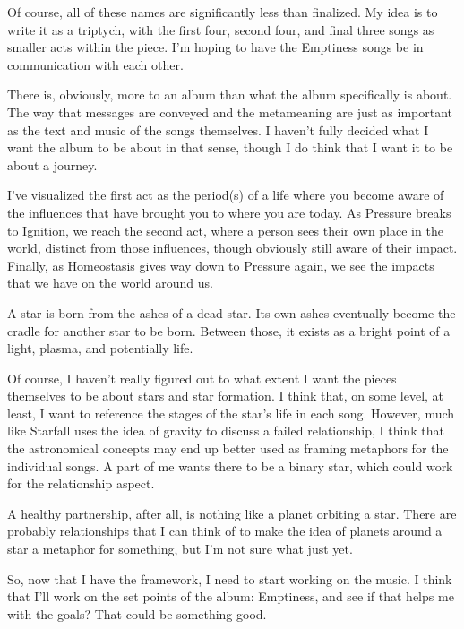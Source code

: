 \documentclass[12pt]{article}[titlepage]
\renewcommand{\,}{\textsuperscript{,}}
\begin{document}
Of course, all of these names are significantly less than finalized.
My idea is to write it as a triptych, with the first four, second four, and final three songs as smaller acts within the piece.
I'm hoping to have the Emptiness songs be in communication with each other.

There is, obviously, more to an album than what the album specifically is about.
The way that messages are conveyed and the metameaning\endnotemark[7] are just as important as the text and music of the songs themselves.
I haven't fully decided what I want the album to be about in that sense, though I do think that I want it to be about a journey.

I've visualized the first act as the period(s) of a life where you become aware of the influences that have brought you to where you are today.
As Pressure breaks to Ignition, we reach the second act, where a person sees their own place in the world, distinct from those influences, though obviously still aware of their impact.
Finally, as Homeostasis gives way down to Pressure again, we see the impacts that we have on the world around us.

A star is born from the ashes of a dead star.
Its own ashes eventually become the cradle for another star to be born.
Between those, it exists as a bright point of a light, plasma, and potentially life.

Of course, I haven't really figured out to what extent I want the pieces themselves to be about stars and star formation.
I think that, on some level, at least, I want to reference the stages of the star's life in each song.
However, much like Starfall uses the idea of gravity to discuss a failed relationship, I think that the astronomical concepts may end up better used as framing metaphors for the individual songs.
A part of me wants there to be a binary star, which could work for the relationship aspect.

A healthy partnership, after all, is nothing like a planet orbiting a star.
There are probably relationships that I can think of to make the idea of planets around a star a metaphor for something, but I'm not sure what just yet.

So, now that I have the framework, I need to start working on the music.
I think that I'll work on the set points of the album: Emptiness, and see if that helps me with the goals?
That could be something good.
\end{document}
